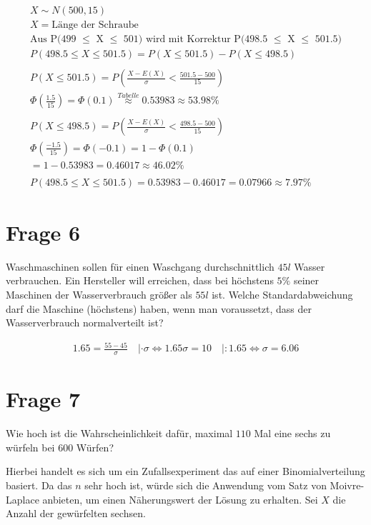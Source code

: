\begin{align*}
    X \sim N(500, 15) \\
    X = \text{Länge der Schraube} \\
    \text{Aus P(499 $\leq$ X $\leq$ 501) wird mit Korrektur P(498.5 $\leq$ X $\leq$ 501.5)} \\
    P(498.5 \leq X \leq 501.5) = P(X \leq 501.5) - P(X \leq 498.5) \\
    \\
    P(X \leq 501.5) = P\left(\frac{X - E(X)}{\sigma} < \frac{501.5 - 500}{15}\right) \\
    \Phi(\frac{1.5}{15}) = \Phi(0.1) \overset{Tabelle}{\approx} 0.53983 \approx 53.98\% \\
    \\
    P(X \leq 498.5) = P\left(\frac{X - E(X)}{\sigma} < \frac{498.5 - 500}{15}\right) \\
    \Phi\left(\frac{-1.5}{15}\right) = \Phi(-0.1) = 1 - \Phi(0.1)\\
    = 1 - 0.53983 = 0.46017 \approx 46.02\%\\
    \\
    P(498.5 \leq X \leq 501.5) = 0.53983 - 0.46017 = 0.07966 \approx 7.97\%
\end{align*}

\section{Frage 6}

Waschmaschinen sollen für einen Waschgang durchschnittlich $45l$ Wasser verbrauchen. Ein Hersteller will erreichen, dass bei höchstens $5\%$ seiner Maschinen der Wasserverbrauch größer als $55l$ ist.
Welche Standardabweichung darf die Maschine (höchstens) haben, wenn man voraussetzt, dass der Wasserverbrauch normalverteilt ist?

\begin{align*}
    1.65 = \frac{55 - 45}{\sigma} \quad |\cdot \sigma
    \Leftrightarrow 1.65\sigma = 10 \quad |: 1.65
    \Leftrightarrow \sigma = 6.06
\end{align*}

\section{Frage 7}

Wie hoch ist die Wahrscheinlichkeit dafür, maximal $110$ Mal eine sechs zu würfeln bei $600$ Würfen?

Hierbei handelt es sich um ein Zufallsexperiment das auf einer Binomialverteilung basiert. Da das $n$ sehr hoch ist, würde sich die Anwendung vom Satz von Moivre-Laplace anbieten, um einen Näherungswert der Lösung zu erhalten. Sei $X$ die Anzahl der gewürfelten sechsen.

